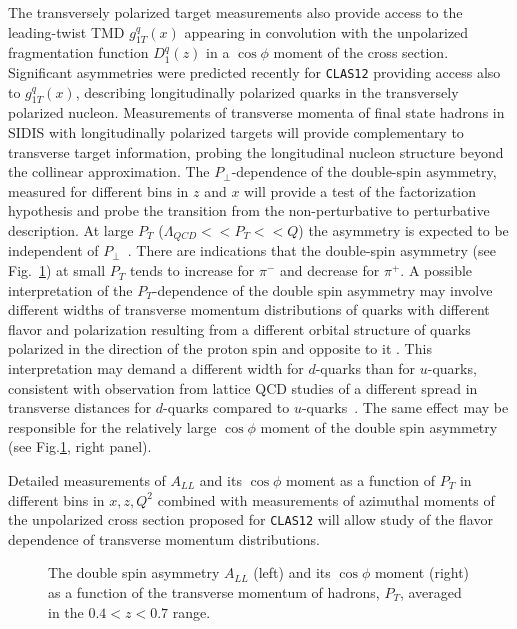The transversely polarized target measurements also provide access to the 
leading-twist TMD $g_{1T}^q(x)$ appearing in convolution with the unpolarized
fragmentation function ${D_1^{q}(z)}$ in a $\cos\phi$ moment of the cross 
section.  Significant asymmetries were predicted recently for {\tt CLAS12} 
\cite{Kotzinian:2006dw} providing access also to $g_{1T}^q(x)$, describing 
longitudinally polarized quarks in the transversely polarized nucleon.
Measurements of transverse momenta of final state hadrons in SIDIS with 
longitudinally polarized targets will provide complementary to transverse 
target information, probing the longitudinal nucleon structure beyond the 
collinear approximation.  The $P_\perp$-dependence of the double-spin 
asymmetry, measured for different bins in $z$ and $x$ will provide a test of 
the factorization hypothesis and probe the transition from the non-perturbative 
to perturbative description.  At large $P_T$ ($\Lambda_{QCD}<<P_T<<Q$) the 
asymmetry is expected to be independent of $P_\perp$~\cite{Ji:2004wu}. 
There are indications that the double-spin asymmetry (see 
Fig.~\ref{a1pptdepvszq47x16}) at small $P_T$ tends to increase for $\pi^-$ 
and decrease for $\pi^+$.  A possible interpretation of the $P_T$-dependence 
of the double spin asymmetry may involve different widths of transverse 
momentum distributions of quarks with different flavor and polarization 
\cite{Anselmino:2006yc} resulting from a different orbital structure of quarks 
polarized in the direction of the proton spin and opposite to it 
\cite{Brodsky:1980zm,Brodsky:1994kg}.  This interpretation may demand a 
different width for $d$-quarks than for $u$-quarks, consistent with 
observation from lattice QCD studies of a different spread in transverse 
distances for $d$-quarks compared to $u$-quarks~\cite{Gockeler:2005cd}.
The same effect may be responsible for the relatively large $\cos\phi$ moment
of the double spin asymmetry (see Fig.\ref{a1pptdepvszq47x16}, right panel).

Detailed measurements of $A_{LL}$ and its $\cos\phi$ moment as a function 
of $P_T$ in different bins in $x,z,Q^2$ combined with measurements of
azimuthal moments of the unpolarized cross section proposed for {\tt CLAS12} 
will allow study of the flavor dependence of transverse momentum distributions.

\begin{figure}[htbp]
\vspace{6.8cm}
\caption{\small{The double spin asymmetry $A_{LL}$ (left) and its $\cos\phi$ 
moment (right) as a function of the transverse momentum of hadrons, $P_T$,  
averaged in the $0.4<z<0.7$ range.}}
\label{a1pptdepvszq47x16}
\end{figure}

